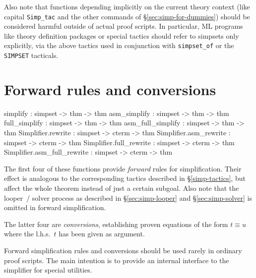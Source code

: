 \medskip

Also note that functions depending implicitly on the current theory
context (like capital \texttt{Simp_tac} and the other commands of
\S\ref{sec:simp-for-dummies}) should be considered harmful outside of
actual proof scripts.  In particular, ML programs like theory
definition packages or special tactics should refer to simpsets only
explicitly, via the above tactics used in conjunction with
\texttt{simpset_of} or the \texttt{SIMPSET} tacticals.


\section{Forward rules and conversions}
\begin{ttbox}
simplify          : simpset -> thm -> thm
asm_simplify      : simpset -> thm -> thm
full_simplify     : simpset -> thm -> thm
asm_full_simplify : simpset -> thm -> thm\medskip
Simplifier.rewrite           : simpset -> cterm -> thm
Simplifier.asm_rewrite       : simpset -> cterm -> thm
Simplifier.full_rewrite      : simpset -> cterm -> thm
Simplifier.asm_full_rewrite  : simpset -> cterm -> thm
\end{ttbox}

The first four of these functions provide \emph{forward} rules for
simplification.  Their effect is analogous to the corresponding
tactics described in \S\ref{simp-tactics}, but affect the whole
theorem instead of just a certain subgoal.  Also note that the
looper~/ solver process as described in \S\ref{sec:simp-looper} and
\S\ref{sec:simp-solver} is omitted in forward simplification.

The latter four are \emph{conversions}, establishing proven equations
of the form $t \equiv u$ where the l.h.s.\ $t$ has been given as
argument.

\begin{warn}
  Forward simplification rules and conversions should be used rarely
  in ordinary proof scripts.  The main intention is to provide an
  internal interface to the simplifier for special utilities.
\end{warn}


